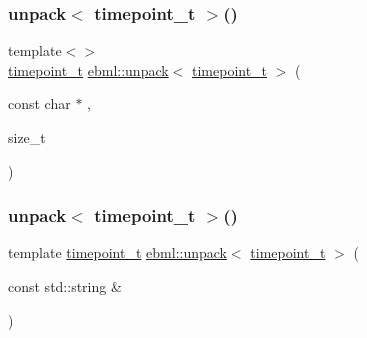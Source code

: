 \mbox{\label{namespaceebml_a939a46f36f4c7e9eaf14bc0ea612256c}} 
\subsubsection{\texorpdfstring{unpack$<$ timepoint\+\_\+t $>$()}{unpack< timepoint\_t >()}\hspace{0.1cm}{\footnotesize\ttfamily [1/2]}}
{\footnotesize\ttfamily template$<$$>$ \\
\mbox{\hyperlink{namespaceebml_a7e667ec3fe8b51fb5b8f9690734d8638}{timepoint\+\_\+t}} \mbox{\hyperlink{namespaceebml_a55a0f9d0c93e80d488021fd03c4f3861}{ebml\+::unpack}}$<$ \mbox{\hyperlink{namespaceebml_a7e667ec3fe8b51fb5b8f9690734d8638}{timepoint\+\_\+t}} $>$ (\begin{DoxyParamCaption}\item[{const char $\ast$}]{,  }\item[{size\+\_\+t}]{ }\end{DoxyParamCaption})}

\mbox{\label{namespaceebml_ac97339d25d5dab88390116547e0ef400}} 
\subsubsection{\texorpdfstring{unpack$<$ timepoint\+\_\+t $>$()}{unpack< timepoint\_t >()}\hspace{0.1cm}{\footnotesize\ttfamily [2/2]}}
{\footnotesize\ttfamily template \mbox{\hyperlink{namespaceebml_a7e667ec3fe8b51fb5b8f9690734d8638}{timepoint\+\_\+t}} \mbox{\hyperlink{namespaceebml_a55a0f9d0c93e80d488021fd03c4f3861}{ebml\+::unpack}}$<$ \mbox{\hyperlink{namespaceebml_a7e667ec3fe8b51fb5b8f9690734d8638}{timepoint\+\_\+t}} $>$ (\begin{DoxyParamCaption}\item[{const std\+::string \&}]{ }\end{DoxyParamCaption})}

\mbox{\label{namespaceebml_a5ed4cbd5d003214f9e309b89ef17d630}} 
